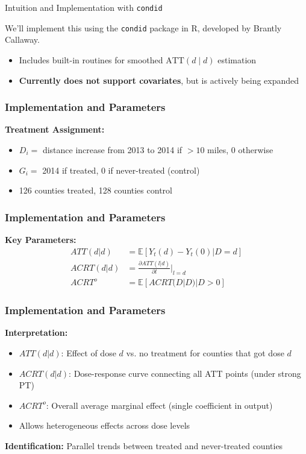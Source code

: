 \documentclass{beamer}
\begin{document}
\begin{frame}{Intuition and Implementation with \texttt{condid}}

We’ll implement this using the \texttt{condid} package in R, developed by Brantly Callaway.

\begin{itemize}
  \item Includes built-in routines for smoothed $\text{ATT}(d \mid d)$ estimation
  \item \textbf{Currently does not support covariates}, but is actively being expanded
\end{itemize}

\end{frame}



\begin{frame}
\frametitle{Implementation and Parameters}

\textbf{Treatment Assignment:}
\begin{itemize}
    \item $D_i = $ distance increase from 2013 to 2014 if $> 10$ miles, 0 otherwise
    \item $G_i = $ 2014 if treated, 0 if never-treated (control)
    \item 126 counties treated, 128 counties control
\end{itemize}

\end{frame}


\begin{frame}
\frametitle{Implementation and Parameters}

\textbf{Key Parameters:}
\begin{align}
ATT(d|d) &= \mathbb{E}[Y_t(d) - Y_t(0) | D=d] \\
ACRT(d|d) &= \frac{\partial ATT(l|d)}{\partial l}\Big|_{l=d} \\
ACRT^o &= \mathbb{E}[ACRT(D|D) | D>0]
\end{align}


\end{frame}


\begin{frame}
\frametitle{Implementation and Parameters}


\textbf{Interpretation:}
\begin{itemize}
    \item $ATT(d|d)$: Effect of dose $d$ vs. no treatment for counties that got dose $d$
    \item $ACRT(d|d)$: Dose-response curve connecting all ATT points (under strong PT)
    \item $ACRT^o$: Overall average marginal effect (single coefficient in output)
    \item Allows heterogeneous effects across dose levels
\end{itemize}

\vspace{0.3cm}

\textbf{Identification:} Parallel trends between treated and never-treated counties

\end{frame}
\end{document}
